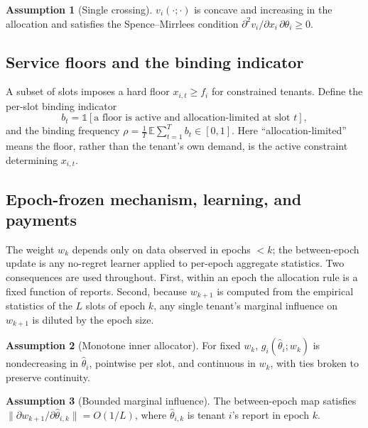\documentclass[conference]{IEEEtran}
\theoremstyle{definition}
\newtheorem{assumption}{Assumption}
\theoremstyle{remark}
\newcommand{\Slots}{T}
\newcommand{\Ep}{L}
\newcommand{\rhobind}{\rho}
\newcommand{\type}{\theta}
\newcommand{\alloc}{x}
\newcommand{\wt}{w}
\newcommand{\val}{v}
\newcommand{\flo}{f}
\newcommand{\bindind}{b}
\newcommand{\E}{\mathbb{E}}
\newcommand{\ind}{\mathbb{1}}
\begin{document}
\begin{assumption}[Single crossing]\label{ass:sc}
$\val_i(\cdot;\cdot)$ is concave and increasing in the allocation and satisfies the Spence--Mirrlees condition $\partial^2\val_i/\partial\alloc_i\,\partial\type_i\ge0$.
\end{assumption}

\subsection{Service floors and the binding indicator}
A subset of slots imposes a hard floor $\alloc_{i,t}\ge\flo_i$ for constrained tenants. Define the per-slot binding indicator
\begin{equation}
\bindind_t=\ind[\text{a floor is active and allocation-limited at slot }t],
\end{equation}
and the binding frequency $\rhobind=\tfrac{1}{\Slots}\,\E\sum_{t=1}^{\Slots}\bindind_t\in[0,1]$. Here ``allocation-limited'' means the floor, rather than the tenant's own demand, is the active constraint determining $\alloc_{i,t}$.

\subsection{Epoch-frozen mechanism, learning, and payments}
The weight $\wt_k$ depends only on data observed in epochs $<k$; the between-epoch update is any no-regret learner applied to per-epoch aggregate statistics. Two consequences are used throughout. First, within an epoch the allocation rule is a fixed function of reports. Second, because $\wt_{k+1}$ is computed from the empirical statistics of the $\Ep$ slots of epoch $k$, any single tenant's marginal influence on $\wt_{k+1}$ is diluted by the epoch size.

\begin{assumption}[Monotone inner allocator]\label{ass:mono}
For fixed $\wt_k$, $g_i(\hat\type_i;\wt_k)$ is nondecreasing in $\hat\type_i$, pointwise per slot, and continuous in $\wt_k$, with ties broken to preserve continuity.
\end{assumption}

\begin{assumption}[Bounded marginal influence]\label{ass:infl}
The between-epoch map satisfies $\lVert\partial\wt_{k+1}/\partial\hat\type_{i,k}\rVert=O(1/\Ep)$, where $\hat\type_{i,k}$ is tenant $i$'s report in epoch $k$.
\end{assumption}
\end{document}
